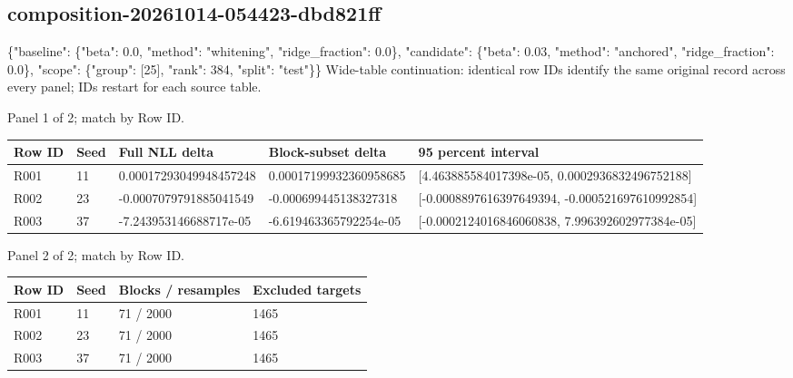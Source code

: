 \documentclass[10pt]{article}
\begin{document}
\subsection{composition-20261014-054423-dbd821ff}
\{"baseline": \{"beta": 0.0, "method": "whitening", "ridge\_fraction": 0.0\}, "candidate": \{"beta": 0.03, "method": "anchored", "ridge\_fraction": 0.0\}, "scope": \{"group": [25], "rank": 384, "split": "test"\}\}
Wide-table continuation: identical row IDs identify the same original record across every panel; IDs restart for each source table.
\par\noindent Panel 1 of 2; match by Row ID.
{\scriptsize\setlength{\tabcolsep}{2pt}
\begin{longtable}{p{}p{}p{}p{}p{}}
Row ID & Seed & Full NLL delta & Block-subset delta & 95 percent interval \\
\hline\endhead
R001 & 11 & 0.00017293049948457248 & 0.00017199932360958685 & [4.463885584017398e-05, 0.0002936832496752188] \\
R002 & 23 & -0.0007079791885041549 & -0.000699445138327318 & [-0.0008897616397649394, -0.000521697610992854] \\
R003 & 37 & -7.243953146688717e-05 & -6.619463365792254e-05 & [-0.0002124016846060838, 7.996392602977384e-05] \\
\end{longtable}}
\par\noindent Panel 2 of 2; match by Row ID.
{\scriptsize\setlength{\tabcolsep}{2pt}
\begin{longtable}{p{}p{}p{}p{}}
Row ID & Seed & Blocks / resamples & Excluded targets \\
\hline\endhead
R001 & 11 & 71 / 2000 & 1465 \\
R002 & 23 & 71 / 2000 & 1465 \\
R003 & 37 & 71 / 2000 & 1465 \\
\end{longtable}}
\end{document}
